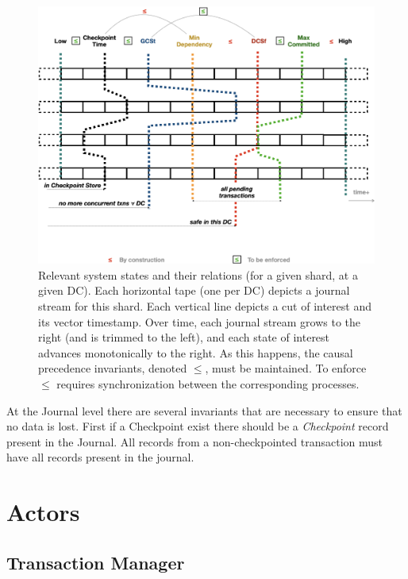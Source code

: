 \documentclass[twoside]{article}
\begin{document}
\begin{figure}[tp]
  \centering
  \includegraphics[width=\textwidth]{figures/cvts.png}
  \caption{%
    Relevant system states and their relations (for a given
    shard, at a given DC).
    Each horizontal tape (one per DC) depicts a journal stream for
    this shard.
    Each vertical line depicts a cut of interest and its
    vector timestamp.
    Over time, each journal stream grows to the right (and is
    trimmed to the left), and each state of interest advances
    monotonically to the right.
    As this happens, the causal precedence invariants, denoted
    $\le$, must be maintained.
    To enforce $\le$ requires synchronization between the corresponding processes.
  }
  \label{fig:system-vts}
\end{figure}

At the Journal level there are several invariants that are necessary to ensure that
no data is lost.
First if a Checkpoint exist there should be a \textit{Checkpoint} record present in
the Journal.
All records from a non-checkpointed transaction must have all records 
present in the journal.

\section{Actors}

\subsection{Transaction Manager}
\label{sec:transaction-daemon}
\end{document}
